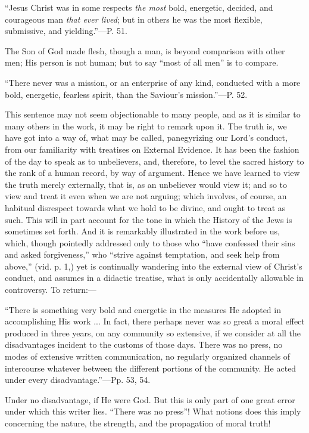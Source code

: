 ``Jesus Christ
was in some respects \emph{the most} bold, energetic, decided, and
courageous man \emph{that ever lived}; but in others he was the most
flexible, submissive, and yielding.''—P. 51.

The Son of God made flesh, though a man, is
beyond comparison with other men; His person is not human; but to say ``most of all men'' is to compare.

``There never was
a mission, or an enterprise of any kind, conducted with a more bold,
energetic, fearless spirit, than the Saviour's mission.''—P. 52.

This sentence may not seem objectionable to many
people, and as it is similar to many others in the work, it may be
right to remark upon it. The truth is, we have got into a way of, what
may be called, panegyrizing our Lord's conduct, from our familiarity
with treatises on External Evidence. It has been the fashion of the
day to speak as to unbelievers, and, therefore, to level the sacred
history to the rank of a human record, by way of argument. Hence we
have learned to view the truth merely externally, that is, as an
unbeliever would view it; and so to view and treat it even when we are
not arguing; which involves, of course, an habitual disrespect towards
what we hold to be divine, and ought to treat as such. This will in
part account for the tone in which the History of the Jews is
sometimes set forth. And it is remarkably illustrated in the work
before us, which, though pointedly addressed only to those who ``have
confessed their sins and asked forgiveness,'' who ``strive against
temptation, and seek help from above,'' (vid. p. 1,) yet is
continually wandering into the external view of Christ's conduct,
and assumes in a didactic treatise, what is only accidentally
allowable in controversy. To return:—

``There is
something very bold and energetic in the measures He adopted in
accomplishing His work ... In fact, there perhaps never was so great a
moral effect produced in three years, on any community so extensive,
if we consider at all the disadvantages incident to the customs of
those days. There was no press, no modes of extensive written
communication, no regularly organized channels of intercourse whatever
between the different portions of the community. He acted under every
disadvantage.''—Pp. 53, 54.

Under no disadvantage, if He were God. But this
is only part of one great error under which this writer lies. ``There
was no press''! What notions does this imply concerning the nature,
the strength, and the propagation of moral truth!

